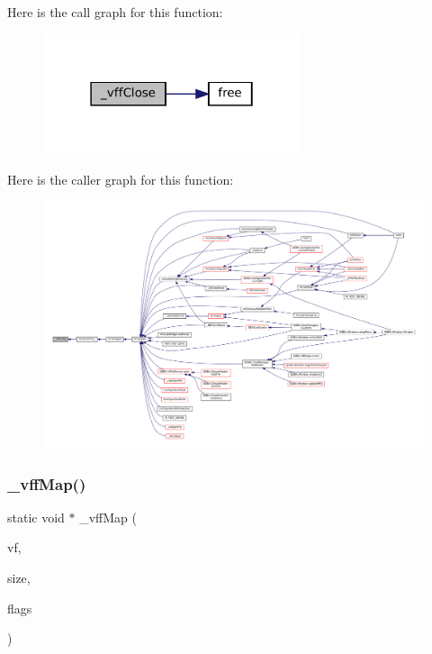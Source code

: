 Here is the call graph for this function\+:
\nopagebreak
\begin{figure}[H]
\begin{center}
\leavevmode
\includegraphics[width=214pt]{vfs-file_8c_ac58e5fcc79e84a452cd675c7902aa225_cgraph}
\end{center}
\end{figure}
Here is the caller graph for this function\+:
\nopagebreak
\begin{figure}[H]
\begin{center}
\leavevmode
\includegraphics[width=350pt]{vfs-file_8c_ac58e5fcc79e84a452cd675c7902aa225_icgraph}
\end{center}
\end{figure}
\mbox{\label{vfs-file_8c_ae264af80ce9f8d7e855924166bbe3866}} 
\subsubsection{\texorpdfstring{\+\_\+vff\+Map()}{\_vffMap()}}
{\footnotesize\ttfamily static void $\ast$ \+\_\+vff\+Map (\begin{DoxyParamCaption}\item[{struct V\+File $\ast$}]{vf,  }\item[{size\+\_\+t}]{size,  }\item[{\mbox{\hyperlink{ioapi_8h_a787fa3cf048117ba7123753c1e74fcd6}{int}}}]{flags }\end{DoxyParamCaption})\hspace{0.3cm}{\ttfamily [static]}}

